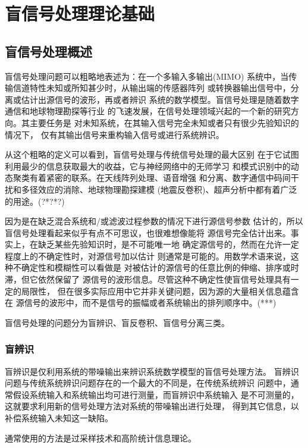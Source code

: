 ﻿%

\chapter{盲信号处理理论基础}
\label{chap01}

\section{盲信号处理概述}
盲信号处理问题可以粗略地表述为：在一个多输入多输出(MIMO)
系统中，当传输信道特性未知或所知甚少时，从输出端的传感器阵列
或转换器输出信号中，分离或估计出源信号的波形，再或者辨识
系统的数学模型。盲信号处理是随着数字通信和地球物理勘探等行业
的飞速发展，在信号处理领域兴起的一个新的研究方向。其主要任务是
对未知系统，在其输入信号完全未知或者只有很少先验知识的情况下，
仅有其输出信号来重构输入信号或进行系统辨识。

从这个粗略的定义可以看到，盲信号处理与传统信号处理的最大区别
在于它试图利用最少的信息获取最大的收益，它与神经网络中的无师学习
和模式识别中的动态聚类有着紧密的联系。在天线阵列处理、语音增强
和分离、数字通信中码间干扰和多径效应的消除、地球物理勘探建模
(地震反卷积)、超声分析中都有着广泛的用途。(?*?*?)

因为是在缺乏混合系统和/或滤波过程参数的情况下进行源信号参数
估计的，所以盲信号处理看起来似乎有点不可思议，也很难想像能将
源信号完全估计出来。事实上，在缺乏某些先验知识时，是不可能唯一地
确定源信号的，然而在允许一定程度上的不确定性时，对源信号加以估计
则通常是可能的。用数学术语来说，这种不确定性和模糊性可以看做是
对被估计的源信号的任意比例的伸缩、排序或时滞，但它依然保留了
源信号的波形信息。尽管这种不确定性使盲信号处理具有一定的局限性，
但在很多实际应用中它并非关键问题，因为源的大量相关信息蕴含在
源信号的波形中，而不是信号的振幅或者系统输出的排列顺序中。(***)

盲信号处理的问题分为盲辨识、盲反卷积、盲信号分离三类。

\subsection{盲辨识}
盲辨识是仅利用系统的带噪输出来辨识系统数学模型的盲信号处理方法。
盲辨识问题与传统系统辨识问题存在的一个最大的不同是，在传统系统辨识
问题中，通常假设系统输入和系统输出均可进行测量，而盲辨识中系统输入
是不可测量的，这就要求利用新的信号处理方法对系统的带噪输出进行处理，
得到其它信息，以补偿系统输入未知这一缺陷。

通常使用的方法是过采样技术和高阶统计信息理论。

